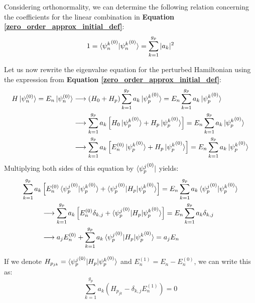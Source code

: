 Considering orthonormality, we can determine the following relation concerning the coefficients for the linear combination in \textbf{Equation \ref{zero_order_approx_initial_def}}:
\begin{equation}
    1 = \braket{{\psi_n^k}^{(0)}|{\psi_n^k}^{(0)}} = \sum_{k=1}^{g_p} |a_k|^2
\end{equation}

Let us now rewrite the eigenvalue equation for the perturbed Hamiltonian using the expression from \textbf{Equation \ref{zero_order_approx_initial_def}}:%
\begin{equation}
    \begin{split}
        H\ket{\psi_n^{(0)}} = E_n\ket{\psi_n^{(0)}} &\longrightarrow (H_0 + H_p)\sum_{k=1}^{g_p} a_k\ket{{\psi_p^k}^{(0)}} = E_n\sum_{k=1}^{g_p} a_k\ket{{\psi_p^k}^{(0)}} \\
        &\longrightarrow \sum_{k=1}^{g_p} a_k\left[H_0\ket{{\psi_p^k}^{(0)}} + H_p\ket{{\psi_p^k}^{(0)}}\right] = E_n\sum_{k=1}^{g_p} a_k\ket{{\psi_p^k}^{(0)}} \\ 
        &\longrightarrow \sum_{k=1}^{g_p} a_k\left[E_n^{(0)}\ket{{\psi_p^k}^{(0)}} + H_p\ket{{\psi_p^k}^{(0)}}\right] = E_n\sum_{k=1}^{g_p} a_k\ket{{\psi_p^k}^{(0)}} \\ 
    \end{split}
\end{equation}
Multiplying both sides of this equation by $\bra{{\psi_p^j}^{(0)}}$ yields:
\begin{equation}
    \begin{split}
        \sum_{k=1}^{g_p} a_k&\left[E_n^{(0)}\braket{{\psi_p^j}^{(0)}|{\psi_p^k}^{(0)}} + \braket{{\psi_p^j}^{(0)}|H_p|{\psi_p^k}^{(0)}}\right] = E_n\sum_{k=1}^{g_p} a_k\braket{{\psi_p^j}^{(0)}|{\psi_p^k}^{(0)}} \\ 
        &\longrightarrow \sum_{k=1}^{g_p} a_k\left[E_n^{(0)}\delta_{k,j} + \braket{{\psi_p^j}^{(0)}|H_p|{\psi_p^k}^{(0)}}\right] = E_n\sum_{k=1}^{g_p} a_k\delta_{k,j} \\ 
        &\longrightarrow a_jE_n^{(0)} + \sum_{k=1}^{g_p} a_k\braket{{\psi_p^j}^{(0)}|H_p|{\psi_p^k}^{(0)}} = a_j E_n \\ 
    \end{split}
\end{equation}

If we denote $H_{p_{jk}} = \braket{{\psi_p^j}^{(0)}|H_p|{\psi_p^k}^{(0)}}$ and $E_n^{(1)}=E_n - E_n^{(0)}$, we can write this as:
\begin{equation}
    \sum_{k=1}^{g_p} a_k\left(H_{p_{jk}}-\delta_{k,j} E_n^{(1)}\right) = 0
\end{equation}

